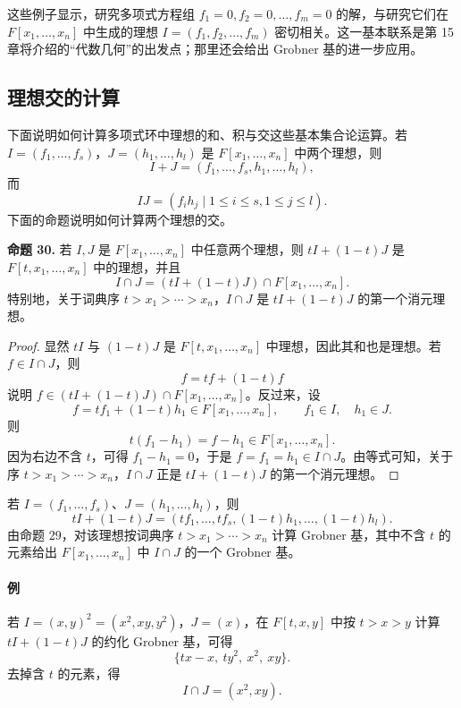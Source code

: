 这些例子显示，研究多项式方程组 $f_1=0,
 f_2=0,\ldots,f_m=0$ 的解，与研究它们在 $F[x_1,\ldots,x_n]$ 中生成的理想 $I=(f_1,f_2,\ldots,f_m)$ 密切相关。这一基本联系是第 15 章将介绍的“代数几何”的出发点；那里还会给出 Grobner 基的进一步应用。

\subsection*{理想交的计算}
下面说明如何计算多项式环中理想的和、积与交这些基本集合论运算。若 $I=(f_1,\ldots,f_s)$，$J=(h_1,\ldots,h_l)$ 是 $F[x_1,\ldots,x_n]$ 中两个理想，则
\[
I+J=(f_1,\ldots,f_s,h_1,\ldots,h_l),
\]
而
\[
IJ=(f_ih_j\mid 1\leq i\leq s,
1\leq j\leq l).
\]
下面的命题说明如何计算两个理想的交。

\noindent\textbf{命题 30.} 若 $I,J$ 是 $F[x_1,\ldots,x_n]$ 中任意两个理想，则 $tI+(1-t)J$ 是 $F[t,x_1,\ldots,x_n]$ 中的理想，并且
\[
I\cap J=(tI+(1-t)J)\cap F[x_1,\ldots,x_n].
\]
特别地，关于词典序 $t>x_1>\cdots>x_n$，$I\cap J$ 是 $tI+(1-t)J$ 的第一个消元理想。

\begin{proof}
	显然 $tI$ 与 $(1-t)J$ 是 $F[t,x_1,\ldots,x_n]$ 中理想，因此其和也是理想。若 $f\in I\cap J$，则
\[
f=tf+(1-t)f
\]
说明 $f\in (tI+(1-t)J)\cap F[x_1,\ldots,x_n]$。反过来，设
\[
f=tf_1+(1-t)h_1\in F[x_1,\ldots,x_n],
\qquad f_1\in I,
\quad h_1\in J.
\]
则
\[
t(f_1-h_1)=f-h_1\in F[x_1,\ldots,x_n].
\]
因为右边不含 $t$，可得 $f_1-h_1=0$，于是 $f=f_1=h_1\in I\cap J$。由等式可知，关于序 $t>x_1>\cdots>x_n$，$I\cap J$ 正是 $tI+(1-t)J$ 的第一个消元理想。
\end{proof}

若 $I=(f_1,\ldots,f_s)$、$J=(h_1,\ldots,h_l)$，则
\[
tI+(1-t)J=(tf_1,\ldots,tf_s,(1-t)h_1,\ldots,(1-t)h_l).
\]
由命题 29，对该理想按词典序 $t>x_1>\cdots>x_n$ 计算 Grobner 基，其中不含 $t$ 的元素给出 $F[x_1,\ldots,x_n]$ 中 $I\cap J$ 的一个 Grobner 基。

\paragraph{例}
若 $I=(x,y)^2=(x^2,xy,y^2)$，$J=(x)$，在 $F[t,x,y]$ 中按 $t>x>y$ 计算 $tI+(1-t)J$ 的约化 Grobner 基，可得
\[
\{tx-x,\ ty^2,\ x^2,\ xy\}.
\]
去掉含 $t$ 的元素，得
\[
I\cap J=(x^2,xy).
\]


